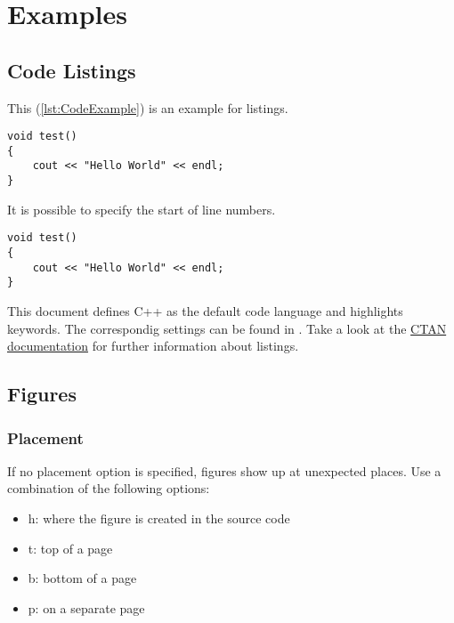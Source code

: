 %
%
\section{Examples}
%
\subsection{Code Listings}
\label{demo:examples:listings}
%
This (\ref{lst:CodeExample}) is an example for listings.
%
\begin{lstlisting}[label={lst:CodeExample},     
 caption={Code Example (\code{HelloWorld.cpp})}]
void test()
{
    cout << "Hello World" << endl;
}
\end{lstlisting}
%
%
It is possible to specify the start of line numbers.
%
\begin{lstlisting}[label={lst:CodeExample2},     
 caption={Changed Numbering (\code{HelloWorld.cpp})},
 firstnumber=20]
void test()
{
    cout << "Hello World" << endl;
}
\end{lstlisting}
%
This document defines C++ as the default code language
and highlights keywords.
The correspondig settings can be found in .
Take a look at the 
\href{http://www.ctan.org/tex-archive/macros/latex/contrib/listings/}
{CTAN documentation} for further information
about listings.
%
\subsection{Figures}
%
\subsubsection{Placement}
If no placement option is specified, figures show up at unexpected places.
Use a combination of the following options:
\begin{itemize}
    \item h: where the figure is created in the source code
    \item t: top of a page
    \item b: bottom of a page
    \item p: on a separate page
\end{itemize}
%
